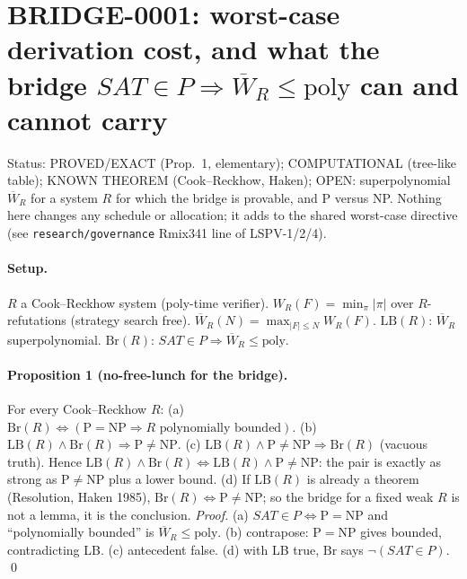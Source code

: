 \documentclass{article}
\begin{document}
\section*{BRIDGE-0001: worst-case derivation cost, and what the bridge $SAT\in P\Rightarrow\overline W_R\le \mathrm{poly}$ can and cannot carry}
Status: PROVED/EXACT (Prop.~1, elementary); COMPUTATIONAL (tree-like table); KNOWN THEOREM (Cook--Reckhow, Haken); OPEN: superpolynomial $\overline W_R$ for a system $R$ for which the bridge is provable, and P versus NP. Nothing here changes any schedule or allocation; it adds to the shared worst-case directive (see \texttt{research/governance} Rmix341 line of LSPV-1/2/4).

\paragraph{Setup.} $R$ a Cook--Reckhow system (poly-time verifier). $W_R(F)=\min_\pi |\pi|$ over $R$-refutations (strategy search free). $\overline W_R(N)=\max_{|F|\le N}W_R(F)$. $\mathrm{LB}(R)$: $\overline W_R$ superpolynomial. $\mathrm{Br}(R)$: $SAT\in P\Rightarrow \overline W_R\le\mathrm{poly}$.

\paragraph{Proposition 1 (no-free-lunch for the bridge).} For every Cook--Reckhow $R$:
(a) $\mathrm{Br}(R)\iff(\mathrm P=\mathrm{NP}\Rightarrow R\text{ polynomially bounded})$.
(b) $\mathrm{LB}(R)\wedge\mathrm{Br}(R)\Rightarrow \mathrm P\ne \mathrm{NP}$.
(c) $\mathrm{LB}(R)\wedge \mathrm P\neq\mathrm{NP}\Rightarrow \mathrm{Br}(R)$ (vacuous truth).
Hence $\mathrm{LB}(R)\wedge\mathrm{Br}(R)\iff \mathrm{LB}(R)\wedge \mathrm P\ne\mathrm{NP}$: the pair is exactly as strong as $\mathrm P\neq\mathrm{NP}$ plus a lower bound. (d) If $\mathrm{LB}(R)$ is already a theorem (Resolution, Haken 1985), $\mathrm{Br}(R)\iff \mathrm P\ne\mathrm{NP}$; so the bridge for a fixed weak $R$ is not a lemma, it is the conclusion.
\emph{Proof.} (a) $SAT\in P\iff \mathrm P=\mathrm{NP}$ and ``polynomially bounded'' is $\overline W_R\le\mathrm{poly}$. (b) contrapose: $\mathrm P=\mathrm{NP}$ gives bounded, contradicting LB. (c) antecedent false. (d) with LB true, $\mathrm{Br}$ says $\neg(SAT\in P)$. \qed
\end{document}
